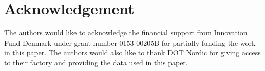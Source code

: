 \section*{Acknowledgement}

The authors would like to acknowledge the financial support from Innovation Fund Denmark under grant number 0153-00205B for partially funding the work in this paper. The authors would also like to thank DOT Nordic for giving access to their factory and providing the data used in this paper.

